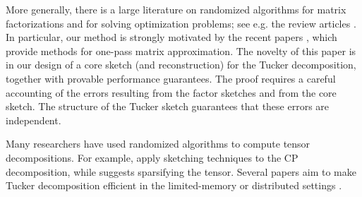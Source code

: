 More generally, there is a large literature on randomized algorithms
for matrix factorizations and for solving optimization problems;
see e.g. the review articles \citep{halko2011finding, woodruff2014sketching}.
In particular, our method is strongly motivated by the recent papers \citep{tropp2018more, tropp2019streaming},
which provide methods for one-pass matrix approximation.
The novelty of this paper is in our design of a core sketch (and reconstruction) for
the Tucker decomposition,
together with provable performance guarantees.
The proof requires a careful accounting of the errors resulting from
the factor sketches and from the core sketch.
The structure of the Tucker sketch guarantees that these errors are independent.

Many researchers have used randomized algorithms to compute tensor decompositions.
For example, \citep{wang2015fast, battaglino2018practical} apply sketching techniques to the CP decomposition,
while \citep{tsourakakis2010mach} suggests sparsifying the tensor. Several papers aim to make Tucker decomposition efficient in the limited-memory or distributed settings \citep{baskaran2012efficient, zhou2014decomposition,
austin2016parallel, kaya2016high, li2015input, battaglino2019faster}.

